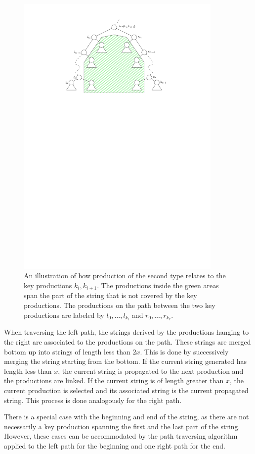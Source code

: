 \documentclass[twoside,11pt,openright]{report}
\begin{document}
\begin{figure}[!htb]
  \centering
  \includegraphics[width=10cm]{images/slp-2nd-type}
  \caption{An illustration of how production of the second type relates to the key productions $k_i, k_{i+1}$. The productions inside the green areas span the part of the string that is not covered by the key productions. The productions on the path between the two key productions are labeled by $l_0, \dots, l_{k_l}$ and $r_0, \dots, r_{k_r}$.}
  \label{fig:slp-2nd-type}
\end{figure}

When traversing the left path, the strings derived by the productions hanging to the right are associated to the productions on the path. These strings are merged bottom up into strings of length less than $2x$. This is done by successively merging the string starting from the bottom. If the current string generated has length less than $x$, the current string is propagated to the next production and the productions are linked. If the current string is of length greater than $x$, the current production is selected and its associated string is the current propagated string. This process is done analogously for the right path.

There is a special case with the beginning and end of the string, as there are not necessarily a key production spanning the first and the last part of the string. However, these cases can be accommodated by the path traversing algorithm applied to the left path for the beginning and one right path for the end.
\end{document}
